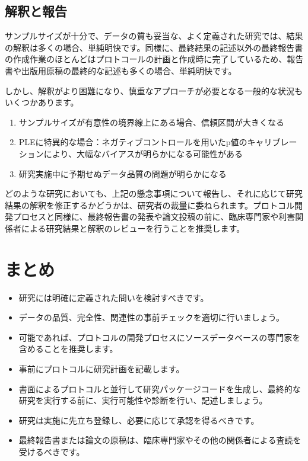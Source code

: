 \documentclass[
  11pt]{book}
\makeatletter
\providecommand{\tightlist}{%
  \setlength{\itemsep}{0pt}\setlength{\parskip}{0pt}}
\newenvironment{kframe}{%
\medskip{}
\setlength{\fboxsep}{.8em}
 \def\at@end@of@kframe{}%
 \ifinner\ifhmode%
  \def\at@end@of@kframe{\end{minipage}}%
  \begin{minipage}{\columnwidth}%
 \fi\fi%
 \def\FrameCommand##1{\hskip\@totalleftmargin \hskip-\fboxsep
 \colorbox{myShadeColor}{##1}\hskip-\fboxsep
     \hskip-\linewidth \hskip-\@totalleftmargin \hskip\columnwidth}%
 \MakeFramed {\advance\hsize-\width
   \@totalleftmargin\z@ \linewidth\hsize
   \@setminipage}}%
 {\par\unskip\endMakeFramed%
 \at@end@of@kframe}
\newenvironment{rmdblock}[1]
  {
  \begin{itemize}
  \renewcommand{\labelitemi}{
    \raisebox{-.7\height}[0pt][0pt]{
      {\setkeys{Gin}{width=3em,keepaspectratio}\texttt{[image: images/\#1]}}
    }
  }
  \setlength{\fboxsep}{1em}
  \begin{kframe}
  \item
  }
  {
  \end{kframe}
  \end{itemize}
  }
\newenvironment{rmdsummary}
  {\begin{rmdblock}{summary}}
  {\end{rmdblock}}
\theoremstyle{definition}
\theoremstyle{definition}
\theoremstyle{definition}
\theoremstyle{definition}
\theoremstyle{remark}
\makeatother
\begin{document}
\subsection{解釈と報告}\label{ux89e3ux91c8ux3068ux5831ux544a}

サンプルサイズが十分で、データの質も妥当な、よく定義された研究では、結果の解釈は多くの場合、単純明快です。同様に、最終結果の記述以外の最終報告書の作成作業のほとんどはプロトコールの計画と作成時に完了しているため、報告書や出版用原稿の最終的な記述も多くの場合、単純明快です。

しかし、解釈がより困難になり、慎重なアプローチが必要となる一般的な状況もいくつかあります。

\begin{enumerate}
\def\labelenumi{\arabic{enumi}.}
\item
  サンプルサイズが有意性の境界線上にある場合、信頼区間が大きくなる
\item
  PLEに特異的な場合：ネガティブコントロールを用いたp値のキャリブレーションにより、大幅なバイアスが明らかになる可能性がある
\item
  研究実施中に予期せぬデータ品質の問題が明らかになる
\end{enumerate}

どのような研究においても、上記の懸念事項について報告し、それに応じて研究結果の解釈を修正するかどうかは、研究者の裁量に委ねられます。プロトコル開発プロセスと同様に、最終報告書の発表や論文投稿の前に、臨床専門家や利害関係者による研究結果と解釈のレビューを行うことを推奨します。

\section{まとめ}\label{ux307eux3068ux3081-16}

\begin{rmdsummary}
\begin{itemize}
\tightlist
\item
  研究には明確に定義された問いを検討すべきです。
\item
  データの品質、完全性、関連性の事前チェックを適切に行いましょう。
\item
  可能であれば、プロトコルの開発プロセスにソースデータベースの専門家を含めることを推奨します。
\item
  事前にプロトコルに研究計画を記載します。
\item
  書面によるプロトコルと並行して研究パッケージコードを生成し、最終的な研究を実行する前に、実行可能性や診断を行い、記述しましょう。
\item
  研究は実施に先立ち登録し、必要に応じて承認を得るべきです。
\item
  最終報告書または論文の原稿は、臨床専門家やその他の関係者による査読を受けるべきです。
\end{itemize}
\end{rmdsummary}
\end{document}

